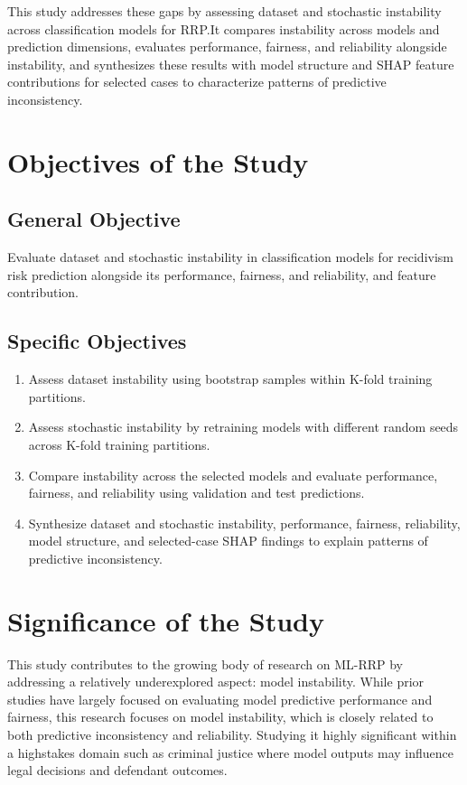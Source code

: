 \documentclass[12pt]{article}
\begin{document}
This study addresses these gaps by assessing dataset and stochastic instability across classification models for RRP.\@ It compares instability across models and prediction dimensions, evaluates performance, fairness, and reliability alongside instability, and synthesizes these results with model structure and SHAP feature contributions for selected cases to characterize patterns of predictive inconsistency.

\section{Objectives of the Study} 
\subsection{General Objective} Evaluate dataset and stochastic instability  in classification models for recidivism risk prediction alongside its performance, fairness, and reliability, and feature contribution.
\subsection{Specific Objectives}
\begin{enumerate}
 \item Assess dataset instability using bootstrap samples within K-fold training partitions.
 \item Assess stochastic instability by retraining models with different random seeds across K-fold training partitions.
 \item Compare instability across the selected models and evaluate performance, fairness, and reliability using validation and test predictions.
 \item Synthesize dataset and stochastic instability, performance, fairness, reliability, model structure, and selected-case SHAP findings to explain patterns of predictive inconsistency.
\end{enumerate}

\section{Significance of the Study}
\tabto{2em} This study contributes to the growing body of research on ML-RRP by addressing a relatively underexplored aspect: model instability. While prior studies have largely focused on evaluating model predictive performance and fairness, this research focuses on model instability, which is closely related to both predictive inconsistency and reliability. Studying it highly significant within a high\-stakes domain such as criminal justice where model outputs may influence legal decisions and defendant outcomes.\\
\end{document}
